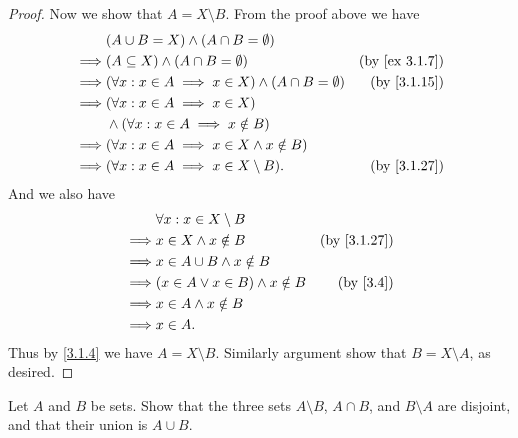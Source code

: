 \begin{proof}
  Now we show that \(A = X \setminus B\).
  From the proof above we have
  \begin{align*}
             & (A \cup B = X) \land (A \cap B = \emptyset)                                                       \\
    \implies & (A \subseteq X) \land (A \cap B = \emptyset)                        & \text{(by \cref{ex 3.1.7})} \\
    \implies & (\forall x : x \in A \implies x \in X) \land (A \cap B = \emptyset) & \text{(by \cref{3.1.15})}   \\
    \implies & (\forall x : x \in A \implies x \in X)                                                            \\
             & \land (\forall x : x \in A \implies x \notin B)                                                   \\
    \implies & (\forall x : x \in A \implies x \in X \land x \notin B)                                           \\
    \implies & (\forall x : x \in A \implies x \in X \setminus B).                 & \text{(by \cref{3.1.27})}
  \end{align*}
  And we also have
  \begin{align*}
             & \forall x : x \in X \setminus B                                     \\
    \implies & x \in X \land x \notin B                & \text{(by \cref{3.1.27})} \\
    \implies & x \in A \cup B \land x \notin B                                     \\
    \implies & (x \in A \lor x \in B) \land x \notin B & \text{(by \cref{3.4})}    \\
    \implies & x \in A \land x \notin B                                            \\
    \implies & x \in A.
  \end{align*}
  Thus by \cref{3.1.4} we have \(A = X \setminus B\).
  Similarly argument show that \(B = X \setminus A\), as desired.
\end{proof}

\begin{exercise}\label{ex 3.1.10}
  Let \(A\) and \(B\) be sets.
  Show that the three sets \(A \setminus B\), \(A \cap B\), and \(B \setminus A\) are disjoint, and that their union is \(A \cup B\).
\end{exercise}

